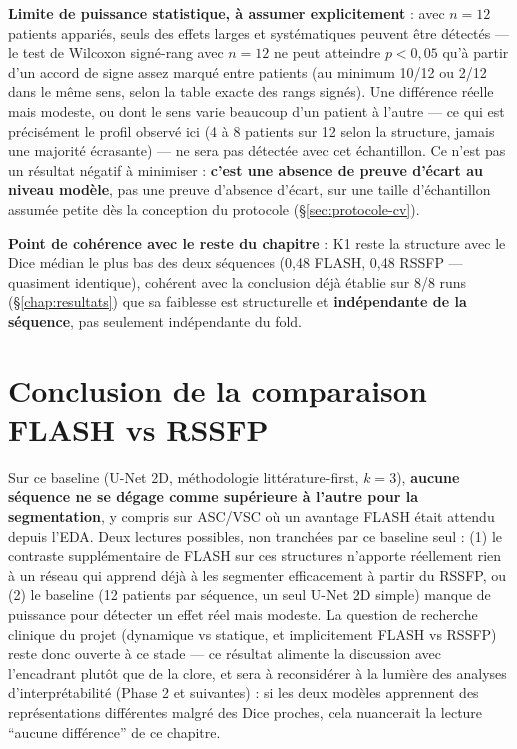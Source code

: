 \documentclass[11pt,a4paper]{report}
\begin{document}
\textbf{Limite de puissance statistique, à assumer explicitement} : avec $n=12$
patients appariés, seuls des effets larges et systématiques peuvent être détectés
--- le test de Wilcoxon signé-rang avec $n=12$ ne peut atteindre $p<0{,}05$
qu'à partir d'un accord de signe assez marqué entre patients (au minimum 10/12 ou
2/12 dans le même sens, selon la table exacte des rangs signés). Une différence
réelle mais modeste, ou dont le sens varie beaucoup d'un patient à l'autre --- ce qui
est précisément le profil observé ici (4 à 8 patients sur 12 selon la structure,
jamais une majorité écrasante) --- ne sera pas détectée avec cet échantillon. Ce
n'est pas un résultat négatif à minimiser : \textbf{c'est une absence de preuve
d'écart au niveau modèle}, pas une preuve d'absence d'écart, sur une taille
d'échantillon assumée petite dès la conception du protocole
(\S\ref{sec:protocole-cv}).

\textbf{Point de cohérence avec le reste du chapitre} : K1 reste la structure avec
le Dice médian le plus bas des deux séquences (0,48 FLASH, 0,48 RSSFP --- quasiment
identique), cohérent avec la conclusion déjà établie sur 8/8 runs
(\S\ref{chap:resultats}) que sa faiblesse est structurelle et \textbf{indépendante de
la séquence}, pas seulement indépendante du fold.

\section{Conclusion de la comparaison FLASH vs RSSFP}

Sur ce baseline (U-Net 2D, méthodologie littérature-first, $k=3$), \textbf{aucune
séquence ne se dégage comme supérieure à l'autre pour la segmentation}, y compris
sur ASC/VSC où un avantage FLASH était attendu depuis l'EDA. Deux lectures possibles,
non tranchées par ce baseline seul : (1) le contraste supplémentaire de FLASH sur
ces structures n'apporte réellement rien à un réseau qui apprend déjà à les
segmenter efficacement à partir du RSSFP, ou (2) le baseline (12 patients par
séquence, un seul U-Net 2D simple) manque de puissance pour détecter un effet réel
mais modeste. La question de recherche clinique du projet (dynamique vs statique,
et implicitement FLASH vs RSSFP) reste donc ouverte à ce stade --- ce résultat
alimente la discussion avec l'encadrant plutôt que de la clore, et sera à
reconsidérer à la lumière des analyses d'interprétabilité (Phase 2 et suivantes) :
si les deux modèles apprennent des représentations différentes malgré des Dice
proches, cela nuancerait la lecture ``aucune différence'' de ce chapitre.
\end{document}
